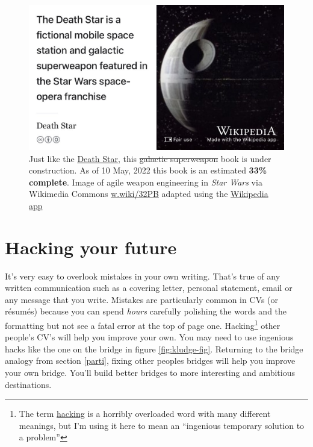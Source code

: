 \documentclass[
]{book}
\begin{document}
\begin{figure}

{\centering \includegraphics[width=0.99\linewidth]{images/DeathStar2} 

}

\caption{Just like the \href{https://en.wikipedia.org/wiki/Death_Star}{Death Star}, this \sout{galactic superweapon} book is under construction. As of 10 May, 2022 this book is an estimated \textbf{33\% complete}. Image of agile weapon engineering in \emph{Star Wars} via Wikimedia Commons \href{https://w.wiki/32PB}{w.wiki/32PB} adapted using the \href{https://apps.apple.com/gb/app/wikipedia/id324715238}{Wikipedia app}}\label{fig:deathstar19-fig}
\end{figure}

\hypertarget{hacking}{%
\chapter{Hacking your future}\label{hacking}}

It's very easy to overlook mistakes in your own writing. That's true of any written communication such as a covering letter, personal statement, email or any message that you write. Mistakes are particularly common in CVs (or résumés) because you can spend \emph{hours} carefully polishing the words and the formatting but not see a fatal error at the top of page one. Hacking\footnote{The term \href{https://en.wikipedia.org/wiki/Hacker_(disambiguation)}{hacking} is a horribly overloaded word with many different meanings, but I'm using it here to mean an ``ingenious temporary solution to a problem''} other people's CV's will help you improve your own. You may need to use ingenious hacks like the one on the bridge in figure \ref{fig:kludge-fig}. Returning to the bridge analogy from section \ref{parti}, fixing other peoples bridges will help you improve your own bridge. You'll build better bridges to more interesting and ambitious destinations.
\end{document}
